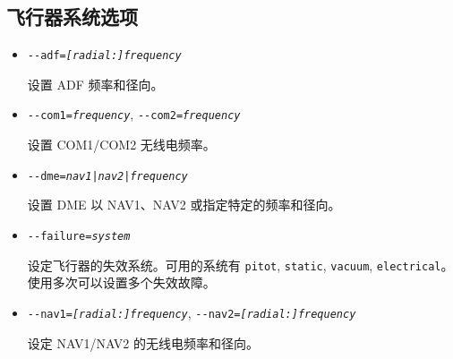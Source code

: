 {
  \subsection{飞行器系统选项}
\begin{itemize}
  \item{\texttt{-$ $-adf={\it [radial:]frequency}}}
 
  设置 ADF 频率和径向。

\item{\texttt{-$ $-com1={\it frequency}}, \texttt{-$ $-com2={\it frequency}}}

 设置 COM1/COM2 无线电频率。

\item{\texttt{-$ $-dme={\it {nav1|nav2|frequency}}}}

 设置 DME 以 NAV1、NAV2 或指定特定的频率和径向。

\item{\texttt{-$ $-failure={\it system}}}

 设定飞行器的失效系统。可用的系统有  \texttt{pitot}, \texttt{static}, \texttt{vacuum}, \texttt{electrical}。使用多次可以设置多个失效故障。

\item{\texttt{-$ $-nav1={\it [radial:]frequency}}, \texttt{-$ $-nav2={\it [radial:]frequency}}}

 设定 NAV1/NAV2 的无线电频率和径向。

\end{itemize}
}
\fi
\iffalse

